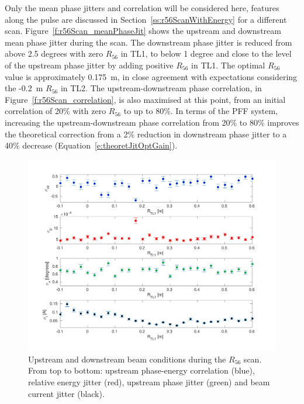 Only the mean phase jitters and correlation will be considered here, features along the pulse are discussed in Section~\ref{ss:r56ScanWithEnergy} for a different scan. Figure~\ref{f:r56Scan_meanPhaseJit} shows the upstream and downstream mean phase jitter during the scan. The downstream phase jitter is reduced from above 2.5 degrees with zero \(R_{56}\) in TL1, to below 1 degree and close to the level of the upstream phase jitter by adding positive \(R_{56}\) in TL1. The optimal \(R_{56}\) value is approximately 0.175~m, in close agreement with expectations considering the -0.2~m \(R_{56}\) in TL2. The upstream-downstream phase correlation, in Figure~\ref{f:r56Scan_correlation}, is also maximised at this point, from an initial correlation of 20\% with zero \(R_{56}\) to up to 80\%. In terms of the PFF system, increasing the upstream-downstream phase correlation from 20\% to 80\% improves the theoretical correction from a 2\% reduction in downstream phase jitter to a 40\% decrease (Equation~\ref{e:theoretJitOptGain}).


\begin{figure}
  \centering
  \includegraphics[width=\textwidth]{Figures/propagation/r56Scan_upstreamParams}
  \caption{Upstream and downstream beam conditions during the \(R_{56}\) scan. From top to bottom: upstream phase-energy correlation (blue), relative energy jitter (red), upstream phase jitter (green) and beam current jitter (black).}
  \label{f:r56Scan_upstreamParams}
\end{figure}

